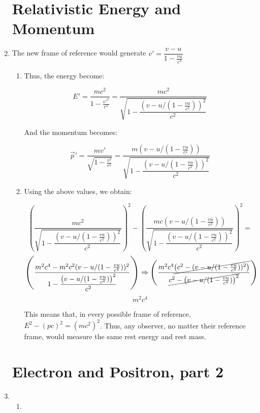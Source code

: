 \begin{enumerate}
    \section*{Relativistic Energy and Momentum}

  \item The new frame of reference would generate $v'=\dfrac{v-u}{1-\frac{vu}{c^2}}$

    \begin{enumerate}

      \item Thus, the energy become:

        $$E'=\dfrac{mc^2}{1-\frac{v'^2}{c^2}}=\boxed{\dfrac{mc^2}{\sqrt{1-\dfrac{\left(v-u/(1-\frac{vu}{c^2})\right)^2}{c^2}}}}$$

        And the momentum becomes:

        $$\vec{p}\prime=\dfrac{mv'}{\sqrt{1-\frac{v^2}{c^2}}}=\boxed{\dfrac{m\left(v-u/(1-\frac{vu}{c^2})\right)}{\sqrt{1-\dfrac{\left(v-u/(1-\frac{vu}{c^2})\right)^2}{c^2}}}}$$

      \item Using the above values, we obtain:

        $$\left(\dfrac{mc^2}{\sqrt{1-\dfrac{\left(v-u/(1-\frac{vu}{c^2})\right)^2}{c^2}}}\right)^2-\left(\dfrac{mc\left(v-u/(1-\frac{vu}{c^2})\right)}{\sqrt{1-\dfrac{\left(v-u/(1-\frac{vu}{c^2})\right)^2}{c^2}}}\right)^2=$$
        $$\left(\dfrac{m^2c^4-m^2c^2(v-u/(1-\frac{vu}{c^2}))^2}{1-\dfrac{\left(v-u/(1-\frac{vu}{c^2})\right)^2}{c^2}}\right)\Rightarrow\left(\dfrac{m^2c^4\cancel{\left(c^2-(v-u/(1-\frac{vu}{c^2}))^2\right)}}{\cancel{c^2-\left(v-u/(1-\frac{vu}{c^2})\right)^2}}\right) $$
        $$\boxed{m^2c^4}$$

        This means that, in every possible frame of reference, $E^2-(pc)^2=(mc^2)^2$. Thus, any observer, no matter their reference frame, would measure the same rest energy and rest mass.

    \end{enumerate}

    \section*{Electron and Positron, part 2}

  \item

    \begin{enumerate}

      \item  


\end{enumerate}
\end{enumerate}
